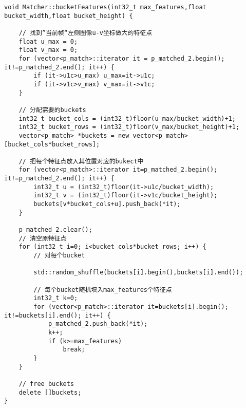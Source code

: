 \documentclass[UTF8]{ctexart}
\begin{document}
    \begin{verbatim}
void Matcher::bucketFeatures(int32_t max_features,float bucket_width,float bucket_height) {

    // 找到”当前帧“左侧图像u-v坐标做大的特征点
    float u_max = 0;
    float v_max = 0;
    for (vector<p_match>::iterator it = p_matched_2.begin(); it!=p_matched_2.end(); it++) {
        if (it->u1c>u_max) u_max=it->u1c;
        if (it->v1c>v_max) v_max=it->v1c;
    }

    // 分配需要的buckets
    int32_t bucket_cols = (int32_t)floor(u_max/bucket_width)+1;
    int32_t bucket_rows = (int32_t)floor(v_max/bucket_height)+1;
    vector<p_match> *buckets = new vector<p_match>[bucket_cols*bucket_rows];

    // 把每个特征点放入其位置对应的bukect中
    for (vector<p_match>::iterator it=p_matched_2.begin(); it!=p_matched_2.end(); it++) {
        int32_t u = (int32_t)floor(it->u1c/bucket_width);
        int32_t v = (int32_t)floor(it->v1c/bucket_height);
        buckets[v*bucket_cols+u].push_back(*it);
    }
    
    p_matched_2.clear();
    // 清空原特征点
    for (int32_t i=0; i<bucket_cols*bucket_rows; i++) {
        // 对每个bucket
        
        std::random_shuffle(buckets[i].begin(),buckets[i].end());
        
        // 每个bucket随机填入max_features个特征点
        int32_t k=0;
        for (vector<p_match>::iterator it=buckets[i].begin(); it!=buckets[i].end(); it++) {
            p_matched_2.push_back(*it);
            k++;
            if (k>=max_features)
                break;
        }
    }

    // free buckets
    delete []buckets;
}        
    \end{verbatim}
\end{document}
